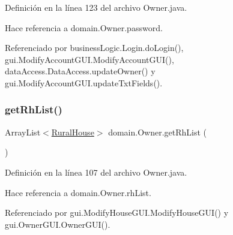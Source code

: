 Definición en la línea 123 del archivo Owner.\+java.


\begin{DoxyCode}{0}

\end{DoxyCode}


Hace referencia a domain.\+Owner.\+password.



Referenciado por business\+Logic.\+Login.\+do\+Login(), gui.\+Modify\+Account\+G\+U\+I.\+Modify\+Account\+G\+U\+I(), data\+Access.\+Data\+Access.\+update\+Owner() y gui.\+Modify\+Account\+G\+U\+I.\+update\+Txt\+Fields().

\mbox{\label{classdomain_1_1_owner_a49e337ac1f7dc0b15c3006c5f08800d7}} 
\subsubsection{\texorpdfstring{getRhList()}{getRhList()}}
{\footnotesize\ttfamily Array\+List$<$\mbox{\hyperlink{classdomain_1_1_rural_house}{Rural\+House}}$>$ domain.\+Owner.\+get\+Rh\+List (\begin{DoxyParamCaption}{ }\end{DoxyParamCaption})}



Definición en la línea 107 del archivo Owner.\+java.


\begin{DoxyCode}{0}

\end{DoxyCode}


Hace referencia a domain.\+Owner.\+rh\+List.



Referenciado por gui.\+Modify\+House\+G\+U\+I.\+Modify\+House\+G\+U\+I() y gui.\+Owner\+G\+U\+I.\+Owner\+G\+U\+I().

\mbox{\label{classdomain_1_1_owner_ab8266177e084a78aaf73947b23a20de8}} 
